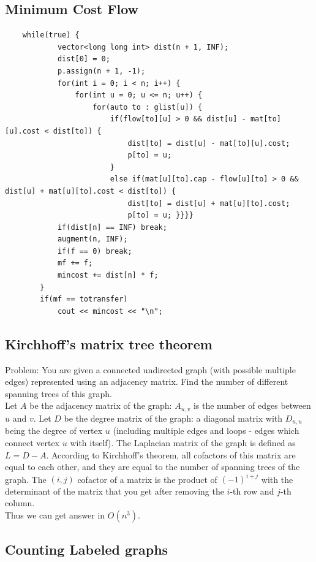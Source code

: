 \documentclass[8pt, a4paper, oneside, twocolumn]{extarticle}
\begin{document}
\subsection{Minimum Cost Flow}
\begin{verbatim}
    while(true) {
            vector<long long int> dist(n + 1, INF);
            dist[0] = 0;
            p.assign(n + 1, -1);
            for(int i = 0; i < n; i++) {
                for(int u = 0; u <= n; u++) {
                    for(auto to : glist[u]) {
                        if(flow[to][u] > 0 && dist[u] - mat[to][u].cost < dist[to]) {
                            dist[to] = dist[u] - mat[to][u].cost;
                            p[to] = u;
                        }
                        else if(mat[u][to].cap - flow[u][to] > 0 && dist[u] + mat[u][to].cost < dist[to]) {
                            dist[to] = dist[u] + mat[u][to].cost;
                            p[to] = u; }}}}
            if(dist[n] == INF) break;
            augment(n, INF);
            if(f == 0) break;
            mf += f;
            mincost += dist[n] * f;
        }
        if(mf == totransfer)
            cout << mincost << "\n";
\end{verbatim}
\subsection{Kirchhoff's matrix tree theorem}
Problem: You are given a connected undirected graph (with possible multiple edges) represented using an adjacency matrix. Find the number of different spanning trees of this graph.
\\Let $A$ be the adjacency matrix of the graph: $A_{u,v}$ is the number of edges between $u$ and $v$. Let $D$ be the degree matrix of the graph: a diagonal matrix with $D_{u,u}$ being the degree of vertex $u$ (including multiple edges and loops - edges which connect vertex $u$ with itself).
The Laplacian matrix of the graph is defined as $L = D - A$. According to Kirchhoff's theorem, all cofactors of this matrix are equal to each other, and they are equal to the number of spanning trees of the graph. The $(i,j)$ cofactor of a matrix is the product of $(-1)^{i + j}$ with the determinant of the matrix that you get after removing the $i$-th row and $j$-th column.\\ Thus we can get answer in $O(n^3)$.
\subsection{Counting Labeled graphs}
\end{document}
